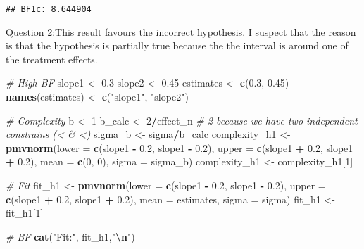 \documentclass[
]{article}
\newenvironment{Shaded}{\begin{snugshade}}{\end{snugshade}}
\newcommand{\AttributeTok}[1]{\textcolor[rgb]{0.13,0.29,0.53}{#1}}
\newcommand{\CommentTok}[1]{\textcolor[rgb]{0.56,0.35,0.01}{\textit{#1}}}
\newcommand{\DecValTok}[1]{\textcolor[rgb]{0.00,0.00,0.81}{#1}}
\newcommand{\FloatTok}[1]{\textcolor[rgb]{0.00,0.00,0.81}{#1}}
\newcommand{\FunctionTok}[1]{\textcolor[rgb]{0.13,0.29,0.53}{\textbf{#1}}}
\newcommand{\NormalTok}[1]{#1}
\newcommand{\OtherTok}[1]{\textcolor[rgb]{0.56,0.35,0.01}{#1}}
\newcommand{\SpecialCharTok}[1]{\textcolor[rgb]{0.81,0.36,0.00}{\textbf{#1}}}
\newcommand{\StringTok}[1]{\textcolor[rgb]{0.31,0.60,0.02}{#1}}
\begin{document}
\begin{verbatim}
## BF1c: 8.644904
\end{verbatim}

Question 2:This result favours the incorrect hypothesis. I suspect that
the reason is that the hypothesis is partially true because the the
interval is around one of the treatment effects.

\begin{Shaded}
\begin{Highlighting}[]
\CommentTok{\# High BF}
\NormalTok{slope1 }\OtherTok{\textless{}{-}} \FloatTok{0.3}
\NormalTok{slope2 }\OtherTok{\textless{}{-}} \FloatTok{0.45}
\NormalTok{estimates }\OtherTok{\textless{}{-}} \FunctionTok{c}\NormalTok{(}\FloatTok{0.3}\NormalTok{, }\FloatTok{0.45}\NormalTok{)}
\FunctionTok{names}\NormalTok{(estimates) }\OtherTok{\textless{}{-}} \FunctionTok{c}\NormalTok{(}\StringTok{"slope1"}\NormalTok{, }\StringTok{"slope2"}\NormalTok{)}

\CommentTok{\# Complexity}
\NormalTok{b }\OtherTok{\textless{}{-}} \DecValTok{1}
\NormalTok{b\_calc }\OtherTok{\textless{}{-}} \DecValTok{2}\SpecialCharTok{/}\NormalTok{effect\_n }\CommentTok{\# 2 because we have two independent constrains (\textless{} \& \textless{})}
\NormalTok{sigma\_b }\OtherTok{\textless{}{-}}\NormalTok{ sigma}\SpecialCharTok{/}\NormalTok{b\_calc}
\NormalTok{complexity\_h1 }\OtherTok{\textless{}{-}} \FunctionTok{pmvnorm}\NormalTok{(}\AttributeTok{lower =} \FunctionTok{c}\NormalTok{(slope1 }\SpecialCharTok{{-}} \FloatTok{0.2}\NormalTok{, slope1 }\SpecialCharTok{{-}} \FloatTok{0.2}\NormalTok{), }\AttributeTok{upper =} \FunctionTok{c}\NormalTok{(slope1 }\SpecialCharTok{+} \FloatTok{0.2}\NormalTok{, slope1 }\SpecialCharTok{+} \FloatTok{0.2}\NormalTok{), }
                             \AttributeTok{mean =} \FunctionTok{c}\NormalTok{(}\DecValTok{0}\NormalTok{, }\DecValTok{0}\NormalTok{), }\AttributeTok{sigma =}\NormalTok{ sigma\_b)}
\NormalTok{complexity\_h1 }\OtherTok{\textless{}{-}}\NormalTok{ complexity\_h1[}\DecValTok{1}\NormalTok{]}

\CommentTok{\# Fit }
\NormalTok{fit\_h1 }\OtherTok{\textless{}{-}} \FunctionTok{pmvnorm}\NormalTok{(}\AttributeTok{lower =} \FunctionTok{c}\NormalTok{(slope1 }\SpecialCharTok{{-}} \FloatTok{0.2}\NormalTok{, slope1 }\SpecialCharTok{{-}} \FloatTok{0.2}\NormalTok{), }\AttributeTok{upper =} \FunctionTok{c}\NormalTok{(slope1 }\SpecialCharTok{+} \FloatTok{0.2}\NormalTok{, slope1 }\SpecialCharTok{+} \FloatTok{0.2}\NormalTok{), }
                  \AttributeTok{mean =}\NormalTok{ estimates, }\AttributeTok{sigma =}\NormalTok{ sigma)}
\NormalTok{fit\_h1 }\OtherTok{\textless{}{-}}\NormalTok{ fit\_h1[}\DecValTok{1}\NormalTok{]}

\CommentTok{\# BF}
\FunctionTok{cat}\NormalTok{(}\StringTok{"Fit:"}\NormalTok{, fit\_h1,}\StringTok{"}\SpecialCharTok{\textbackslash{}n}\StringTok{"}\NormalTok{)}
\end{Highlighting}
\end{Shaded}
\end{document}
